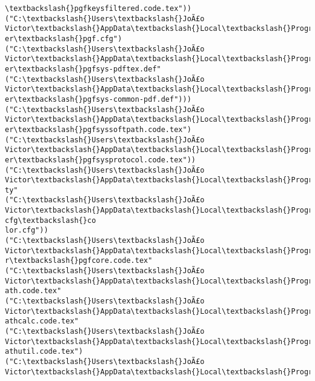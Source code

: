 \documentclass[11pt]{article}
\begin{document}
\begin{Verbatim}[commandchars=\\\{\}]
\textbackslash{}pgfkeysfiltered.code.tex"))
("C:\textbackslash{}Users\textbackslash{}JoÃ£o Victor\textbackslash{}AppData\textbackslash{}Local\textbackslash{}Programs\textbackslash{}MiKTeX\textbackslash{}tex/generic/pgf/systemlay
er\textbackslash{}pgf.cfg")
("C:\textbackslash{}Users\textbackslash{}JoÃ£o Victor\textbackslash{}AppData\textbackslash{}Local\textbackslash{}Programs\textbackslash{}MiKTeX\textbackslash{}tex/generic/pgf/systemlay
er\textbackslash{}pgfsys-pdftex.def"
("C:\textbackslash{}Users\textbackslash{}JoÃ£o Victor\textbackslash{}AppData\textbackslash{}Local\textbackslash{}Programs\textbackslash{}MiKTeX\textbackslash{}tex/generic/pgf/systemlay
er\textbackslash{}pgfsys-common-pdf.def")))
("C:\textbackslash{}Users\textbackslash{}JoÃ£o Victor\textbackslash{}AppData\textbackslash{}Local\textbackslash{}Programs\textbackslash{}MiKTeX\textbackslash{}tex/generic/pgf/systemlay
er\textbackslash{}pgfsyssoftpath.code.tex")
("C:\textbackslash{}Users\textbackslash{}JoÃ£o Victor\textbackslash{}AppData\textbackslash{}Local\textbackslash{}Programs\textbackslash{}MiKTeX\textbackslash{}tex/generic/pgf/systemlay
er\textbackslash{}pgfsysprotocol.code.tex"))
("C:\textbackslash{}Users\textbackslash{}JoÃ£o Victor\textbackslash{}AppData\textbackslash{}Local\textbackslash{}Programs\textbackslash{}MiKTeX\textbackslash{}tex/latex/xcolor\textbackslash{}xcolor.s
ty"
("C:\textbackslash{}Users\textbackslash{}JoÃ£o Victor\textbackslash{}AppData\textbackslash{}Local\textbackslash{}Programs\textbackslash{}MiKTeX\textbackslash{}tex/latex/graphics-cfg\textbackslash{}co
lor.cfg"))
("C:\textbackslash{}Users\textbackslash{}JoÃ£o Victor\textbackslash{}AppData\textbackslash{}Local\textbackslash{}Programs\textbackslash{}MiKTeX\textbackslash{}tex/generic/pgf/basiclaye
r\textbackslash{}pgfcore.code.tex"
("C:\textbackslash{}Users\textbackslash{}JoÃ£o Victor\textbackslash{}AppData\textbackslash{}Local\textbackslash{}Programs\textbackslash{}MiKTeX\textbackslash{}tex/generic/pgf/math\textbackslash{}pgfm
ath.code.tex"
("C:\textbackslash{}Users\textbackslash{}JoÃ£o Victor\textbackslash{}AppData\textbackslash{}Local\textbackslash{}Programs\textbackslash{}MiKTeX\textbackslash{}tex/generic/pgf/math\textbackslash{}pgfm
athcalc.code.tex"
("C:\textbackslash{}Users\textbackslash{}JoÃ£o Victor\textbackslash{}AppData\textbackslash{}Local\textbackslash{}Programs\textbackslash{}MiKTeX\textbackslash{}tex/generic/pgf/math\textbackslash{}pgfm
athutil.code.tex")
("C:\textbackslash{}Users\textbackslash{}JoÃ£o Victor\textbackslash{}AppData\textbackslash{}Local\textbackslash{}Programs\textbackslash{}MiKTeX\textbackslash{}tex/generic/pgf/math\textbackslash{}pgfm

\end{Verbatim}
\end{document}
